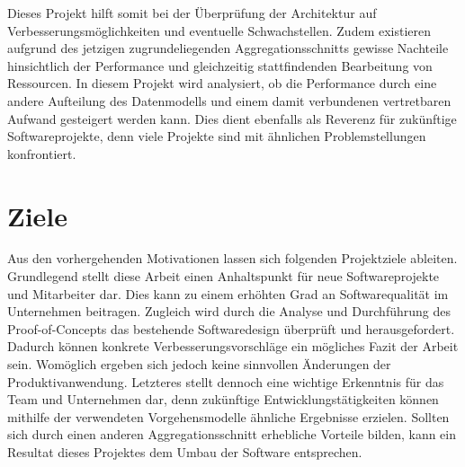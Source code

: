 Dieses Projekt hilft somit bei der Überprüfung der Architektur auf Verbesserungsmöglichkeiten und eventuelle Schwachstellen. Zudem existieren aufgrund des jetzigen zugrundeliegenden Aggregationsschnitts gewisse Nachteile hinsichtlich der Performance und gleichzeitig stattfindenden Bearbeitung von Ressourcen. In diesem Projekt wird analysiert, ob die Performance durch eine andere Aufteilung des Datenmodells und einem damit verbundenen vertretbaren Aufwand gesteigert werden kann. Dies dient ebenfalls als Reverenz für zukünftige Softwareprojekte, denn viele Projekte sind mit ähnlichen Problemstellungen konfrontiert.



\section{Ziele}

Aus den vorhergehenden Motivationen lassen sich folgenden Projektziele ableiten. Grundlegend stellt diese Arbeit einen Anhaltspunkt für neue Softwareprojekte und Mitarbeiter dar. Dies kann zu einem erhöhten Grad an Softwarequalität im Unternehmen beitragen. Zugleich wird durch die Analyse und Durchführung des Proof-of-Concepts das bestehende Softwaredesign überprüft und herausgefordert. Dadurch können konkrete Verbesserungsvorschläge ein mögliches Fazit der Arbeit sein. Womöglich ergeben sich jedoch keine sinnvollen Änderungen der Produktivanwendung. Letzteres stellt dennoch eine wichtige Erkenntnis für das Team und Unternehmen dar, denn zukünftige Entwicklungstätigkeiten können mithilfe der verwendeten Vorgehensmodelle ähnliche Ergebnisse erzielen. Sollten sich durch einen anderen Aggregationsschnitt erhebliche Vorteile bilden, kann ein Resultat dieses Projektes dem Umbau der Software entsprechen.
